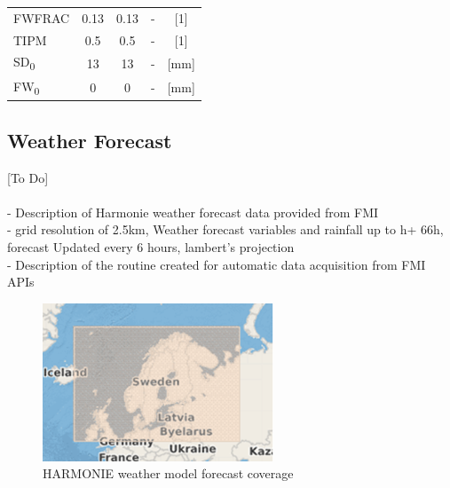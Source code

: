 \begin{table}[h]
\begin{tabular}{lcccc}
FWFRAC             & 0.13                                                                                       & 0.13                                                                                       & -                                                                                                 & {[}1{]}             \\
TIPM               & 0.5                                                                                        & 0.5                                                                                        & -                                                                                                 & {[}1{]}             \\
SD\textsubscript{0}                & 13                                                                                         & 13                                                                                         & -                                                                                                 & {[}mm{]}            \\
FW\textsubscript{0}                & 0                                                                                          & 0                                                                                          & -                                                                                                 & {[}mm{]}           
\\ \bottomrule
\end{tabular}
\end{table}


\subsection{Weather Forecast}
[To Do]\\\\

- Description of Harmonie weather forecast data provided from FMI\\
- grid resolution of 2.5km, Weather forecast variables and rainfall up to h+ 66h, forecast Updated every 6 hours, lambert's projection\\
- Description of the routine created for automatic data acquisition from FMI APIs\\

\begin{figure}[ht]
    \centering
	\includegraphics[scale=1.2]{figures/harmoniecoverage.png}
	\caption{HARMONIE weather model forecast coverage}
	\label{fig:harmonie}
\end{figure}



